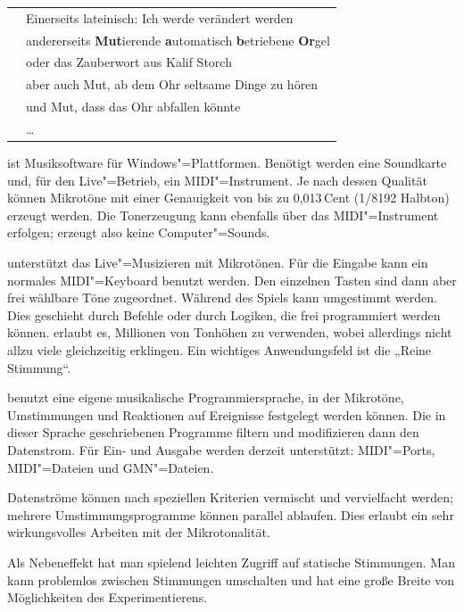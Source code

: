 \begin{tabular}{l@{\ \ --\ \ \ }l}
\mutabor{}  & Einerseits lateinisch: Ich werde verändert werden \\
\mutabor{}  & andererseits {\bfseries Mut}ierende {\bfseries a}utomatisch 
               {\bfseries b}etriebene {\bfseries Or}gel  \\
\mutabor{}  & oder das Zauberwort aus Kalif Storch \\
\mutabor{}  & aber auch Mut, ab dem Ohr seltsame Dinge zu hören \\
\mutabor{}  & und Mut, dass das Ohr abfallen könnte \\
\mutabor{}  & \ldots \\
\end{tabular}

\mutabor[~3] ist Musiksoftware für Windows"=Plattformen.  Benötigt
werden eine Soundkarte und, für den Live"=Betrieb, ein MIDI"=Instrument.
Je nach dessen Qualität können Mikrotöne mit einer
Genauigkeit von bis zu 0,013\,Cent (1/8192 Halbton) erzeugt werden. Die
Tonerzeugung kann ebenfalls über das MIDI"=Instrument erfolgen;
\mutabor{} erzeugt also keine Computer"=Sounds.

\mutabor{} unterstützt das Live"=Musizieren mit Mikrotönen.  Für die
Eingabe kann ein normales MIDI"=Keyboard benutzt werden.  Den einzelnen
Tasten sind dann aber frei wählbare Töne zugeordnet.  Während des
Spiels kann umgestimmt werden. Dies geschieht durch Befehle oder durch
Logiken, die frei programmiert werden können. \mutabor{} erlaubt es,
Millionen von Tonhöhen zu verwenden, wobei allerdings nicht
allzu viele gleichzeitig erklingen. Ein wichtiges Anwendungsfeld ist
die „Reine Stimmung“.

\mutabor{} benutzt eine eigene musikalische Programmiersprache, in der
Mikrotöne, Umstimmungen und Reaktionen auf Ereignisse festgelegt
werden können. Die in dieser Sprache geschriebenen Programme filtern
und modifizieren dann den Datenstrom. Für Ein- und Ausgabe werden
derzeit unterstützt: MIDI"=Ports, MIDI"=Dateien und GMN"=Dateien.

Datenströme können nach speziellen Kriterien vermischt und
vervielfacht werden; mehrere Umstimmungsprogramme können parallel
ablaufen. Dies erlaubt ein sehr wirkungsvolles Arbeiten mit der
Mikrotonalität.

Als Nebeneffekt hat man spielend leichten Zugriff auf statische 
Stimmungen. Man kann problemlos zwischen Stimmungen umschalten 
und hat eine große Breite von Möglichkeiten des Experimentierens.


